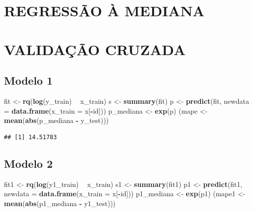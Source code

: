 \documentclass[]{article}
\newenvironment{Shaded}{\begin{snugshade}}{\end{snugshade}}
\newcommand{\KeywordTok}[1]{\textcolor[rgb]{0.13,0.29,0.53}{\textbf{#1}}}
\newcommand{\DataTypeTok}[1]{\textcolor[rgb]{0.13,0.29,0.53}{#1}}
\newcommand{\StringTok}[1]{\textcolor[rgb]{0.31,0.60,0.02}{#1}}
\newcommand{\OperatorTok}[1]{\textcolor[rgb]{0.81,0.36,0.00}{\textbf{#1}}}
\newcommand{\NormalTok}[1]{#1}
\begin{document}
\section{REGRESSÃO À MEDIANA}\label{regressao-a-mediana}

\section{VALIDAÇÃO CRUZADA}\label{validacao-cruzada-1}

\subsection{Modelo 1}\label{modelo-1-2}

\begin{Shaded}
\begin{Highlighting}[]
\NormalTok{fit <-}\StringTok{ }\KeywordTok{rq}\NormalTok{(}\KeywordTok{log}\NormalTok{(y_train) }\OperatorTok{~}\StringTok{ }\NormalTok{x_train)}
\NormalTok{s <-}\StringTok{ }\KeywordTok{summary}\NormalTok{(fit)}
\NormalTok{p <-}\StringTok{ }\KeywordTok{predict}\NormalTok{(fit, }\DataTypeTok{newdata =} \KeywordTok{data.frame}\NormalTok{(}\DataTypeTok{x_train =}\NormalTok{ x[}\OperatorTok{-}\NormalTok{id]))}
\NormalTok{p_mediana <-}\StringTok{ }\KeywordTok{exp}\NormalTok{(p)}
\NormalTok{(mape <-}\StringTok{ }\KeywordTok{mean}\NormalTok{(}\KeywordTok{abs}\NormalTok{(p_mediana }\OperatorTok{-}\StringTok{ }\NormalTok{y_test)))}
\end{Highlighting}
\end{Shaded}

\begin{verbatim}
## [1] 14.51783
\end{verbatim}

\subsection{Modelo 2}\label{modelo-2-2}

\begin{Shaded}
\begin{Highlighting}[]
\NormalTok{fit1 <-}\StringTok{ }\KeywordTok{rq}\NormalTok{(}\KeywordTok{log}\NormalTok{(y1_train) }\OperatorTok{~}\StringTok{ }\NormalTok{x_train)}
\NormalTok{s1 <-}\StringTok{ }\KeywordTok{summary}\NormalTok{(fit1)}
\NormalTok{p1 <-}\StringTok{ }\KeywordTok{predict}\NormalTok{(fit1, }\DataTypeTok{newdata =} \KeywordTok{data.frame}\NormalTok{(}\DataTypeTok{x_train =}\NormalTok{ x[}\OperatorTok{-}\NormalTok{id]))}
\NormalTok{p1_mediana <-}\StringTok{ }\KeywordTok{exp}\NormalTok{(p1)}
\NormalTok{(mape1 <-}\StringTok{ }\KeywordTok{mean}\NormalTok{(}\KeywordTok{abs}\NormalTok{(p1_mediana }\OperatorTok{-}\StringTok{ }\NormalTok{y1_test)))}
\end{Highlighting}
\end{Shaded}
\end{document}
